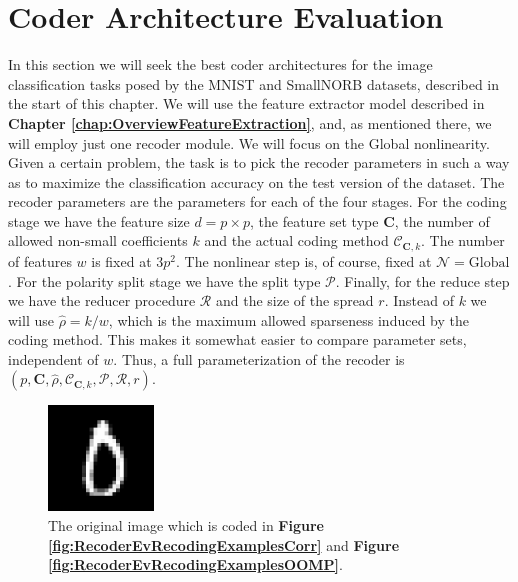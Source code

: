 \documentclass[12pt,a4paper,oneside,english]{UPBThesis}
\newcommand{\hctimes}[2]{{#1}\!\times\!{#2}}
\begin{document}
\section{Coder Architecture Evaluation}
\label{sec:CoderArchitectureEvaluation}

In this section we will seek the best coder architectures for the image classification tasks posed by the MNIST and SmallNORB datasets, described in the start of this chapter. We will use the feature extractor model described in \textbf{Chapter \ref{chap:OverviewFeatureExtraction}}, and, as mentioned there, we will employ just one recoder module. We will focus on the Global nonlinearity. Given a certain problem, the task is to pick the recoder parameters in such a way as to maximize the classification accuracy on the test version of the dataset. The recoder parameters are the parameters for each of the four stages. For the coding stage we have the feature size $d = \hctimes{p}{p}$, the feature set type $\textbf{C}$, the number of allowed non-small coefficients $k$ and the actual coding method $\mathcal{C}_{\textbf{C},k}$. The number of features $w$ is fixed at $3p^2$. The nonlinear step is, of course, fixed at $\mathcal{N} = \mbox{Global}$. For the polarity split stage we have the split type $\mathcal{P}$. Finally, for the reduce step we have the reducer procedure $\mathcal{R}$ and the size of the spread $r$. Instead of $k$ we will use $\hat{\rho} = k/w$, which is the maximum allowed sparseness induced by the coding method. This makes it somewhat easier to compare parameter sets, independent of $w$. Thus, a full parameterization of the recoder is $(p,\textbf{C},\hat{\rho},\mathcal{C}_{\textbf{C},k},\mathcal{P},\mathcal{R},r)$.

\begin{figure}
\begin{center}
\includegraphics[width=0.25\textwidth]{thesis_data/recoderev/original_image.png}
\end{center}
\caption{The original image which is coded in \textbf{Figure \ref{fig:RecoderEvRecodingExamplesCorr}} and \textbf{Figure \ref{fig:RecoderEvRecodingExamplesOOMP}}.}
\label{fig:RecoderEvOriginalImage}
\end{figure}
\end{document}
